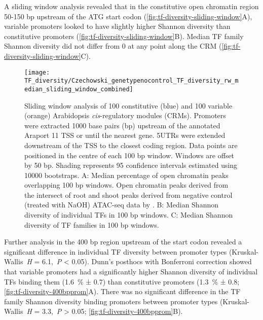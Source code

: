\documentclass[../main.tex]{subfiles}
\begin{document}
A sliding window analysis revealed that in the constitutive open chromatin region 50-150 bp upstream of the ATG start codon (\autoref{fig:tf-diversity-sliding-window}A), variable promoters looked to have slightly higher Shannon diversity than constitutive promoters (\autoref{fig:tf-diversity-sliding-window}B). Median TF family Shannon diversity did not differ from 0 at any point along the CRM (\autoref{fig:tf-diversity-sliding-window}C).

 \begin{figure}[hbt!]
	\begin{center}
		\capstart
		\texttt{[image: TF\_diversity/Czechowski\_genetypenocontrol\_TF\_diversity\_rw\_median\_sliding\_window\_combined]}
		\caption{
			Sliding window analysis of 100 constitutive (blue) and 100 variable (orange) Arabidopsis \textit{cis}\hyp{}regulatory modules (CRMs).
			Promoters were extracted 1000 base pairs (bp) upstream of the annotated Araport 11 \autocite{chengAraport11CompleteReannotation2017} TSS or until the nearest gene.
			5UTRs were extended downstream of the TSS to the closest coding region.
			Data points are positioned in the centre of each 100 bp window.
			Windows are offset by 50 bp.
			Shading represents 95 confidence intervals estimated using 10000 bootstraps.
			A: Median percentage of open chromatin peaks overlapping 100 bp windows. Open chromatin peaks derived from the intersect of root and shoot peaks derived from negative control (treated with NaOH) ATAC\hyp{}seq data by \textcite{potterCytokininModulatesContextdependent2018}.	
			B: Median Shannon diversity of individual TFs in 100 bp windows.
			C: Median Shannon diversity of TF families in 100 bp windows.
			\label{fig:tf-diversity-sliding-window}
		}
	\end{center}
\end{figure}

Further analysis in the 400 bp region upstream of the start codon revealed a significant difference in individual TF diversity between promoter types (Kruskal\hyp{}Wallis~\textit{H} = 6.1,~\textit{P} \textless{} 0.05).
Dunn's posthocs with Bonferroni correction showed that variable promoters had a significantly higher Shannon diversity of individual TFs binding them (\SI{1.6}{\percent} ± 0.7) than constitutive promoters (\SI{1.3}{\percent} ± 0.8; \autoref{fig:tf-diversity-400bpprom}A).
There was no significant difference in the TF family Shannon diversity binding promoters between promoter types (Kruskal\hyp{}Wallis~\textit{H} = 3.3,~\textit{P} \textgreater{} 0.05; \autoref{fig:tf-diversity-400bpprom}B).
\end{document}

